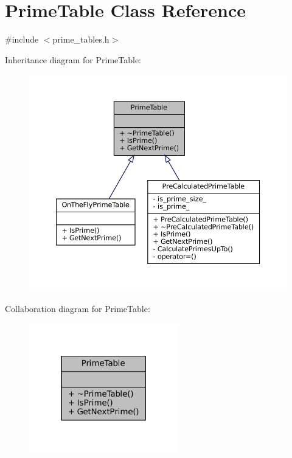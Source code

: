 \hypertarget{classPrimeTable}{}\section{Prime\+Table Class Reference}
\label{classPrimeTable}


{\ttfamily \#include $<$prime\+\_\+tables.\+h$>$}



Inheritance diagram for Prime\+Table\+:
\nopagebreak
\begin{figure}[H]
\begin{center}
\leavevmode
\includegraphics[width=350pt]{classPrimeTable__inherit__graph}
\end{center}
\end{figure}


Collaboration diagram for Prime\+Table\+:
\nopagebreak
\begin{figure}[H]
\begin{center}
\leavevmode
\includegraphics[width=184pt]{classPrimeTable__coll__graph}
\end{center}
\end{figure}
